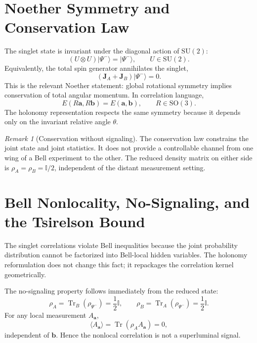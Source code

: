 \documentclass[
  aps,
  pra,
  reprint,
  superscriptaddress,
  nofootinbib,
  longbibliography,
  floatfix,
  amsmath,
  amssymb
]{revtex4-2}
\theoremstyle{plain}
\theoremstyle{definition}
\theoremstyle{remark}
\newtheorem{remark}[theorem]{Remark}
\newcommand{\ket}[1]{\lvert #1\rangle}
\newcommand{\Tr}{\operatorname{Tr}}
\newcommand{\SU}{\mathrm{SU}}
\newcommand{\SO}{\mathrm{SO}}
\newcommand{\Id}{\mathbb{I}}
\begin{document}
\section{Noether Symmetry and Conservation Law}
\label{sec:noether}

The singlet state is invariant under the diagonal action of \(\SU(2)\):
\begin{equation}
(U\otimes U)\ket{\Psi^-}=\ket{\Psi^-},
\qquad U\in\SU(2).
\label{eq:singletinvariance}
\end{equation}
Equivalently, the total spin generator annihilates the singlet,
\begin{equation}
(\bm J_A+\bm J_B)\ket{\Psi^-}=0.
\label{eq:totalspinzero}
\end{equation}
This is the relevant Noether statement: global rotational symmetry implies conservation of total angular momentum.  In correlation language,
\begin{equation}
E(R\bm a,R\bm b)=E(\bm a,\bm b),
\qquad R\in\SO(3).
\end{equation}
The holonomy representation respects the same symmetry because it depends only on the invariant relative angle \(\theta\).

\begin{remark}[Conservation without signaling]
The conservation law constrains the joint state and joint statistics.  It does not provide a controllable channel from one wing of a Bell experiment to the other.  The reduced density matrix on either side is \(\rho_A=\rho_B=\Id/2\), independent of the distant measurement setting.
\end{remark}

\section{Bell Nonlocality, No-Signaling, and the Tsirelson Bound}
\label{sec:bell}

The singlet correlations violate Bell inequalities because the joint probability distribution cannot be factorized into Bell-local hidden variables.  The holonomy reformulation does not change this fact; it repackages the correlation kernel geometrically.

The no-signaling property follows immediately from the reduced state:
\begin{equation}
\rho_A=\Tr_B(\rho_{\Psi^-})=\frac12\Id,
\qquad
\rho_B=\Tr_A(\rho_{\Psi^-})=\frac12\Id.
\end{equation}
For any local measurement \(A_{\bm a}\),
\begin{equation}
\langle A_{\bm a}\rangle=\Tr(\rho_A A_{\bm a})=0,
\end{equation}
independent of \(\bm b\).  Hence the nonlocal correlation is not a superluminal signal.
\end{document}
